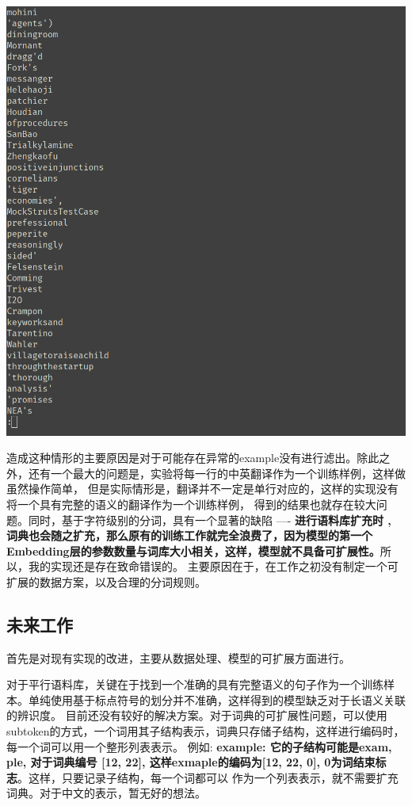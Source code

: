 \documentclass[UTF8,a4paper,10pt]{ctexart}
\begin{document}
\centerline{\includegraphics[scale=0.5]{pics/190605-vocab.png}}

造成这种情形的主要原因是对于可能存在异常的example没有进行滤出。除此之外，还有一个最大的问题是，实验将每一行的中英翻译作为一个训练样例，这样做虽然操作简单，
但是实际情形是，翻译并不一定是单行对应的，这样的实现没有将一个具有完整的语义的翻译作为一个训练样例， 得到的结果也就存在较大问题。同时，基于字符级别的分词，具有一个显著的缺陷 ---- \textbf{进行语料库扩充时
, 词典也会随之扩充，那么原有的训练工作就完全浪费了，因为模型的第一个Embedding层的参数数量与词库大小相关，这样，模型就不具备可扩展性。}所以，我的实现还是存在致命错误的。
主要原因在于，在工作之初没有制定一个可扩展的数据方案，以及合理的分词规则。
\subsection{未来工作}
首先是对现有实现的改进，主要从数据处理、模型的可扩展方面进行。

对于平行语料库，关键在于找到一个准确的具有完整语义的句子作为一个训练样本。单纯使用基于标点符号的划分并不准确，这样得到的模型缺乏对于长语义关联的辨识度。
目前还没有较好的解决方案。对于词典的可扩展性问题，可以使用subtoken的方式，一个词用其子结构表示，词典只存储子结构，这样进行编码时，每一个词可以用一个整形列表表示。
例如: \textbf{example: 它的子结构可能是exam, ple, 对于词典编号 [12, 22], 这样exmaple的编码为[12, 22, 0], 0为词结束标志}。这样，只要记录子结构，每一个词都可以
作为一个列表表示，就不需要扩充词典。对于中文的表示，暂无好的想法。
\end{document}
